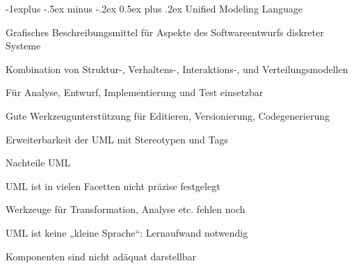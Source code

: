 \documentclass[a4paper]{article}
\makeatletter
\renewcommand{\subsection}{\@startsection{subsection}{2}{0mm}%
                                {-1explus -.5ex minus -.2ex}%
                                {0.5ex plus .2ex}%
                                {\normalfont\normalsize\bfseries}}
\makeatother
\begin{document}
\begin{multicols}{3}
  \subsection{Unified Modeling Language}
  \begin{itemize*}
    \item Grafisches Beschreibungsmittel für Aspekte des Softwareentwurfs diskreter Systeme
    \item Kombination von Struktur-, Verhaltens-, Interaktions-, und Verteilungsmodellen
    \item Für Analyse, Entwurf, Implementierung und Test einsetzbar
    \item Gute Werkzeugunterstützung für Editieren, Versionierung, Codegenerierung
    \item Erweiterbarkeit der UML mit Stereotypen und Tags
  \end{itemize*}

  Nachteile UML
  \begin{itemize*}
    \item UML ist in vielen Facetten nicht präzise festgelegt
    \item Werkzeuge für Transformation, Analyse etc. fehlen noch
    \item UML ist keine „kleine Sprache“: Lernaufwand notwendig
    \item Komponenten sind nicht adäquat darstellbar
  \end{itemize*}


\end{multicols}
\end{document}
